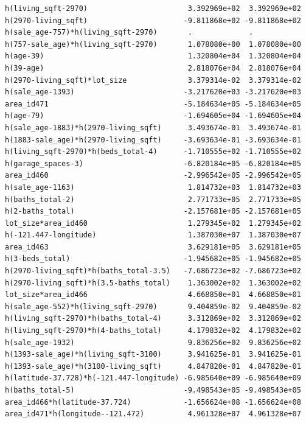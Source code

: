 \documentclass[
]{article}
\begin{document}
\begin{verbatim}
h(living_sqft-2970)                       3.392969e+02  3.392969e+02
h(2970-living_sqft)                      -9.811868e+02 -9.811868e+02
h(sale_age-757)*h(living_sqft-2970)       .             .           
h(757-sale_age)*h(living_sqft-2970)       1.078080e+00  1.078080e+00
h(age-39)                                 1.320804e+04  1.320804e+04
h(39-age)                                 2.818076e+04  2.818076e+04
h(2970-living_sqft)*lot_size              3.379314e-02  3.379314e-02
h(sale_age-1393)                         -3.217620e+03 -3.217620e+03
area_id471                               -5.184634e+05 -5.184634e+05
h(age-79)                                -1.694605e+04 -1.694605e+04
h(sale_age-1883)*h(2970-living_sqft)      3.493674e-01  3.493674e-01
h(1883-sale_age)*h(2970-living_sqft)     -3.693634e-01 -3.693634e-01
h(living_sqft-2970)*h(beds_total-4)      -1.710555e+02 -1.710555e+02
h(garage_spaces-3)                       -6.820184e+05 -6.820184e+05
area_id460                               -2.996542e+05 -2.996542e+05
h(sale_age-1163)                          1.814732e+03  1.814732e+03
h(baths_total-2)                          2.771733e+05  2.771733e+05
h(2-baths_total)                         -2.157681e+05 -2.157681e+05
lot_size*area_id460                       1.279345e+02  1.279345e+02
h(-121.447-longitude)                     1.387030e+07  1.387030e+07
area_id463                                3.629181e+05  3.629181e+05
h(3-beds_total)                          -1.945682e+05 -1.945682e+05
h(2970-living_sqft)*h(baths_total-3.5)   -7.686723e+02 -7.686723e+02
h(2970-living_sqft)*h(3.5-baths_total)    1.363002e+02  1.363002e+02
lot_size*area_id466                       4.668850e+01  4.668850e+01
h(sale_age-552)*h(living_sqft-2970)       9.404859e-02  9.404859e-02
h(living_sqft-2970)*h(baths_total-4)      3.312869e+02  3.312869e+02
h(living_sqft-2970)*h(4-baths_total)      4.179832e+02  4.179832e+02
h(sale_age-1932)                          9.836256e+02  9.836256e+02
h(1393-sale_age)*h(living_sqft-3100)      3.941625e-01  3.941625e-01
h(1393-sale_age)*h(3100-living_sqft)      4.847820e-01  4.847820e-01
h(latitude-37.728)*h(-121.447-longitude) -6.985640e+09 -6.985640e+09
h(baths_total-5)                         -9.498543e+05 -9.498543e+05
area_id466*h(latitude-37.724)            -1.656624e+08 -1.656624e+08
area_id471*h(longitude--121.472)          4.961328e+07  4.961328e+07
                                                                    

\end{verbatim}
\end{document}
